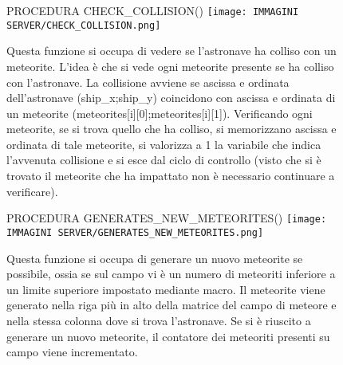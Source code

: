 \documentclass{article}
\begin{document}
\begin{enumerate}
   \begin{figure}[!htb] 
   \item PROCEDURA CHECK\_COLLISION() \newline
       \centering
       \texttt{[image: IMMAGINI SERVER/CHECK\_COLLISION.png]}
       \raggedright\par
       Questa funzione si occupa di vedere se l'astronave ha colliso con un meteorite. L'idea è che si vede ogni meteorite presente se ha colliso con l'astronave. \newline
       La collisione avviene se ascissa e ordinata dell'astronave (ship\_x;ship\_y) coincidono con ascissa e ordinata di un meteorite (meteorites[i][0];meteorites[i][1]). \newline
       Verificando ogni meteorite, se si trova quello che ha colliso, si memorizzano ascissa e ordinata di tale meteorite, si valorizza a 1 la variabile che indica l'avvenuta collisione e si esce dal ciclo di controllo (visto che si è trovato il meteorite che ha impattato non è necessario continuare a verificare).
   \end{figure}

   \begin{figure}[!htb]
   \item PROCEDURA GENERATES\_NEW\_METEORITES() \newline
       \centering
       \texttt{[image: IMMAGINI SERVER/GENERATES\_NEW\_METEORITES.png]}
       \label{fig:enter-label}
       \raggedright\par
       Questa funzione si occupa di generare un nuovo meteorite se possibile, ossia se sul campo vi è un numero di meteoriti inferiore a un limite superiore impostato mediante macro. \newline
       Il meteorite viene generato nella riga più in alto della matrice del campo di meteore e nella stessa colonna dove si trova l'astronave. \newline
       Se si è riuscito a generare un nuovo meteorite, il contatore dei meteoriti presenti su campo viene incrementato. \newline
   \end{figure}


\end{enumerate}
\end{document}
